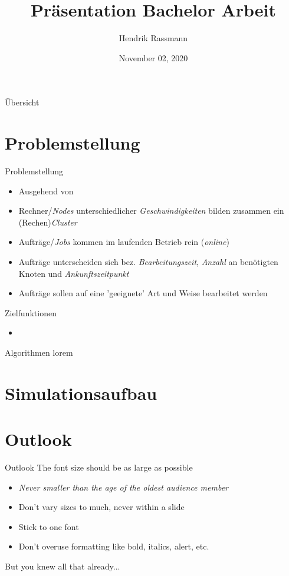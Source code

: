 \documentclass[aspectratio=169,10pt]{beamer}
\title{Pr\"asentation Bachelor Arbeit}
\author{Hendrik Rassmann}
\institute{TU Dortmund University - Department of Computer Science}
\date{November 02, 2020}
\begin{document}
\maketitle

\begin{frame}{Übersicht}
\tableofcontents
\end{frame}



\section{Problemstellung}


\begin{frame}[t,fragile]{Problemstellung}
\begin{itemize}
	\item Ausgehend von
	\item Rechner/\emph{Nodes} unterschiedlicher \emph{Geschwindigkeiten} bilden zusammen ein (Rechen)\emph{Cluster} 
	\item Aufträge/\emph{Jobs} kommen im laufenden Betrieb rein (\emph{online})
	\item Aufträge unterscheiden sich bez. \emph{Bearbeitungszeit}, \emph{Anzahl} an benötigten Knoten und \emph{Ankunftszeitpunkt}
	\item Aufträge sollen auf eine 'geeignete' Art und Weise bearbeitet werden
\end{itemize}
\end{frame}


\begin{frame}[t,fragile]{Zielfunktionen}
\begin{itemize}
	\item \
\end{itemize}
\end{frame}
\begin{frame}[t,fragile]{Algorithmen}
lorem
\end{frame}

\section{Simulationsaufbau}

\section{Outlook}
\begin{frame}{Outlook}
\Large
The font size should be as large as possible
\begin{itemize}
\item \textit{Never smaller than the age of the oldest audience member}
\item Don't vary sizes to much, never within a slide
\item Stick to one font
\item Don't overuse formatting like bold, italics, alert, etc.
\end{itemize}
But you knew all that already...
\end{frame}
\end{document}
